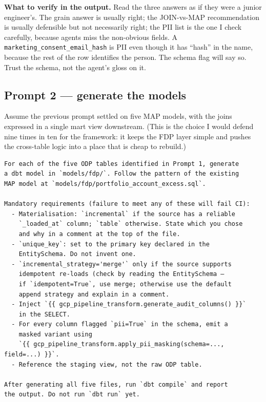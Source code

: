 \documentclass[
  11pt,
  british,
  oneside]{book}
\begin{document}
\textbf{What to verify in the output.} Read the three answers as if they
were a junior engineer's. The grain answer is usually right; the
JOIN-vs-MAP recommendation is usually defensible but not necessarily
right; the PII list is the one I check carefully, because agents miss
the non-obvious fields. A \texttt{marketing\_consent\_email\_hash} is
PII even though it has ``hash'' in the name, because the rest of the row
identifies the person. The schema flag will say so. Trust the schema,
not the agent's gloss on it.

\hypertarget{prompt-2-generate-the-models}{%
\subsection{Prompt 2 --- generate the
models}\label{prompt-2-generate-the-models}}

Assume the previous prompt settled on five MAP models, with the joins
expressed in a single mart view downstream. (This is the choice I would
defend nine times in ten for the framework: it keeps the FDP layer
simple and pushes the cross-table logic into a place that is cheap to
rebuild.)

\begin{verbatim}
For each of the five ODP tables identified in Prompt 1, generate
a dbt model in `models/fdp/`. Follow the pattern of the existing
MAP model at `models/fdp/portfolio_account_excess.sql`.

Mandatory requirements (failure to meet any of these will fail CI):
  - Materialisation: `incremental` if the source has a reliable
    `_loaded_at` column; `table` otherwise. State which you chose
    and why in a comment at the top of the file.
  - `unique_key`: set to the primary key declared in the
    EntitySchema. Do not invent one.
  - `incremental_strategy='merge'` only if the source supports
    idempotent re-loads (check by reading the EntitySchema —
    if `idempotent=True`, use merge; otherwise use the default
    append strategy and explain in a comment.
  - Inject `{{ gcp_pipeline_transform.generate_audit_columns() }}`
    in the SELECT.
  - For every column flagged `pii=True` in the schema, emit a
    masked variant using
    `{{ gcp_pipeline_transform.apply_pii_masking(schema=..., field=...) }}`.
  - Reference the staging view, not the raw ODP table.

After generating all five files, run `dbt compile` and report
the output. Do not run `dbt run` yet.
\end{verbatim}
\end{document}
